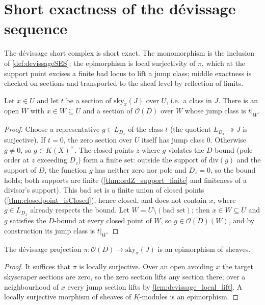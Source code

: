 \section{Short exactness of the dévissage sequence}

The dévissage short complex is short exact. The monomorphism is the inclusion of
\ref{def:devissageSES}; the epimorphism is local surjectivity of \(\pi\), which at the support point
excises a finite bad locus to lift a jump class; middle exactness is checked on sections and
transported to the sheaf level by reflection of limits.

\begin{lemma}
  \label{lem:devissage_local_lift}
  \leanok
  Let \(x \in U\) and let \(t\) be a section of \(\mathrm{sky}_x(J)\) over \(U\), i.e.\ a class in
  \(J\). There is an open \(W\) with \(x \in W \subseteq U\) and a section of \(\mathcal O(D)\) over
  \(W\) whose jump class is \(t|_W\).
\end{lemma}
\begin{proof}
  \leanok
  Choose a representative \(g \in L_{D_x}\) of the class \(t\) (the quotient
  \(L_{D_x} \twoheadrightarrow J\) is surjective). If \(t = 0\), the zero section over \(U\) itself
  has jump class \(0\). Otherwise \(g \neq 0\), so \(g \in K(X)^\times\). The closed points \(z\)
  where \(g\) violates the \(D\)-bound (pole order at \(z\) exceeding \(D_z\)) form a finite set:
  outside the support of \(\mathrm{div}(g)\) and the support of \(D\), the function \(g\) has neither
  zero nor pole and \(D_z = 0\), so the bound holds; both supports are finite
  (\ref{thm:ordZ_support_finite} and finiteness of a divisor's support). This bad set is a finite
  union of closed points (\ref{thm:closedpoint_isClosed}), hence closed, and does not contain \(x\),
  where \(g \in L_{D_x}\) already respects the bound. Let \(W = U \setminus (\text{bad set})\); then
  \(x \in W \subseteq U\) and \(g\) satisfies the \(D\)-bound at every closed point of \(W\), so
  \(g \in \mathcal O(D)(W)\), and by construction its jump class is \(t|_W\).
\end{proof}

\begin{theorem}
  \label{thm:devissageSES_epi_g}
  \leanok
  The dévissage projection \(\pi : \mathcal O(D) \to \mathrm{sky}_x(J)\) is an epimorphism of
  sheaves.
\end{theorem}
\begin{proof}
  \leanok
  It suffices that \(\pi\) is locally surjective. Over an open avoiding \(x\) the target skyscraper
  sections are zero, so the zero section lifts any section there; over a neighbourhood of \(x\)
  every jump section lifts by \ref{lem:devissage_local_lift}. A locally surjective morphism of
  sheaves of \(K\)-modules is an epimorphism.
\end{proof}

